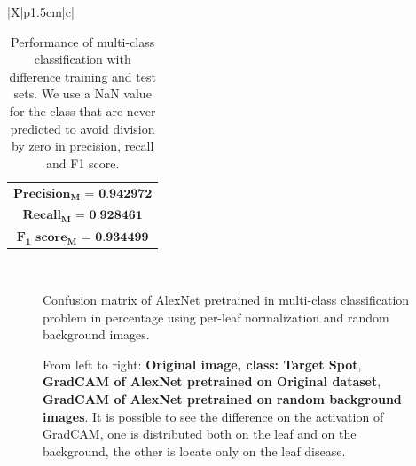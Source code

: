 \begin{table}
\begin{center}
\begin{tabularx}{|X|p{1.5cm}|c|}
\begin{tabular}{@{}c@{}}
				$\textbf{Precision}_\textbf{M}\textbf{ = 0.942972}$ \\
				$\textbf{Recall}_\textbf{M}\textbf{ = 0.928461}$ \\
				$\textbf{F}_\textbf{1}\textbf{ score}_\textbf{M}\textbf{ = 0.934499}$ \\
				\end{tabular} \\  				
			\hline
		\end{tabularx}
	\end{center}
	\caption{Performance of multi-class classification with difference training and test sets. We use a NaN value for the class that are never predicted to avoid division by zero in precision, recall and F1 score.}
	\label{table:sensitivity}
\end{table}
\begin{figure}[t]
	\begin{center}
	\end{center}
	\caption{Confusion matrix of AlexNet pretrained in multi-class classification problem in percentage using per-leaf normalization and random background images.}
	\label{fig:conf_matrix}
	\label{fig:long}
	\label{fig:onecol}
\end{figure}
\begin{figure}[t]
	\begin{center}
	\end{center}
	\caption{From left to right: \textbf{Original image, class: Target Spot}, \textbf{GradCAM of AlexNet pretrained on Original dataset}, \textbf{GradCAM of AlexNet pretrained on random background images}. It is possible to see the difference on the activation of GradCAM, one is distributed both on the leaf and on the background, the other is locate only on the leaf disease.}
	\label{fig:gradcam}
	\label{fig:long}
	\label{fig:onecol}
\end{figure}
